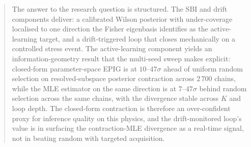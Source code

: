\documentclass[11pt,a4paper]{article}
\begin{document}
\begin{abstract}
The answer to the research question is structured. The SBI and drift components deliver: a calibrated Wilson posterior with under-coverage localised to one direction the Fisher eigenbasis identifies as the active-learning target, and a drift-triggered loop that closes mechanically on a controlled stress event. The active-learning component yields an information-geometry result that the multi-seed sweep makes explicit: closed-form parameter-space EPIG is at $10$--$47\sigma$ ahead of uniform random selection on resolved-subspace posterior contraction across $2\,700$ chains, while the MLE estimator on the same direction is at $7$--$47\sigma$ behind random selection across the same chains, with the divergence stable across $K$ and loop depth. The closed-form contraction is therefore an over-confident proxy for inference quality on this physics, and the drift-monitored loop's value is in surfacing the contraction-MLE divergence as a real-time signal, not in beating random with targeted acquisition.
\end{abstract}
\end{document}
